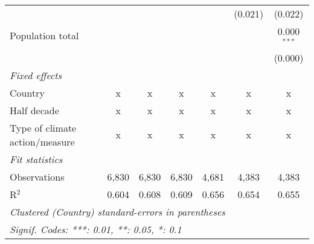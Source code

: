 \begin{tabular}{lcccccc}
                                                                              &         &                &                &                & (0.021)        & (0.022)\\   
   Population total                                                           &         &                &                &                &                & 0.000$^{***}$\\   
                                                                              &         &                &                &                &                & (0.000)\\   
   \emph{Fixed effects}\\
   Country                                                                    & x       & x              & x              & x              & x              & x\\  
   Half decade                                                                & x       & x              & x              & x              & x              & x\\  
   Type of climate action/measure                                             & x       & x              & x              & x              & x              & x\\  
   \midrule \emph{Fit statistics}\\
   Observations                                                               & 6,830   & 6,830          & 6,830          & 4,681          & 4,383          & 4,383\\  
   R$^2$                                                                      & 0.604   & 0.608          & 0.609          & 0.656          & 0.654          & 0.655\\  
   \midrule
   \multicolumn{7}{l}{\emph{Clustered (Country) standard-errors in parentheses}}\\
   \multicolumn{7}{l}{\emph{Signif. Codes: ***: 0.01, **: 0.05, *: 0.1}}\\
\end{tabular}
\par\endgroup


